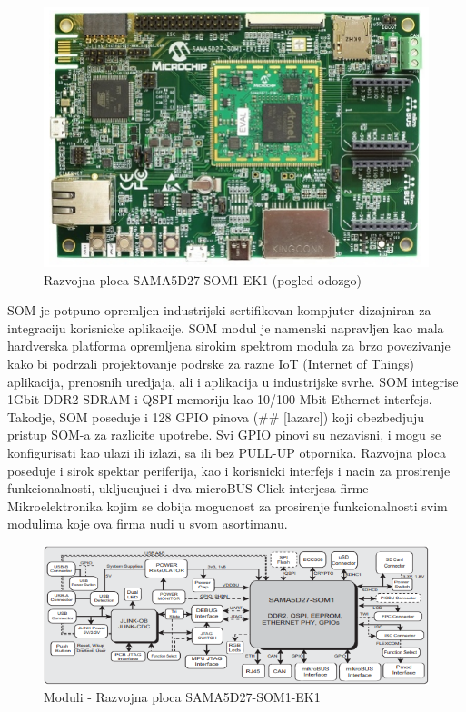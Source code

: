 \documentclass[a4paper,12pt, master]{etf}
\begin{document}
	\begin{figure}[htb]
		\centering
		\includegraphics[scale=.7]{../pic/hw_top_view.png}
		\caption{Razvojna ploca SAMA5D27-SOM1-EK1 (pogled odozgo)}
		\label{fig:hw_top_view}
	\end{figure}


	SOM je potpuno opremljen industrijski sertifikovan kompjuter dizajniran za integraciju
	korisnicke aplikacije. SOM modul je namenski napravljen kao mala hardverska platforma
	opremljena sirokim spektrom modula za brzo povezivanje kako bi podrzali	projektovanje 
	podrske	za razne IoT (Internet of Things) aplikacija, prenosnih uredjaja, ali i aplikacija 
	u industrijske svrhe. SOM integrise 1Gbit DDR2 SDRAM i QSPI memoriju kao 10/100 Mbit 
	Ethernet interfejs. Takodje, SOM poseduje i 128 GPIO pinova (\#\# [lazarc]) koji	
	obezbedjuju pristup	SOM-a za razlicite upotrebe. Svi GPIO pinovi su nezavisni, i mogu se 
	konfigurisati kao ulazi	ili izlazi, sa ili bez PULL-UP otpornika. Razvojna ploca poseduje 
	i	sirok spektar periferija, kao i korisnicki interfejs i nacin za prosirenje 
	funkcionalnosti, ukljucujuci i dva microBUS Click interjesa firme Mikroelektronika kojim 
	se dobija mogucnost za	prosirenje funkcionalnosti svim modulima koje ova firma nudi u 
	svom asortimanu.

	\begin{figure}[htb]
		\centering
		\includegraphics[scale=.7]{../pic/hw_modules.png}
		\caption{Moduli - Razvojna ploca SAMA5D27-SOM1-EK1}
		\label{fig:hw_modules}
	\end{figure}
\end{document}
